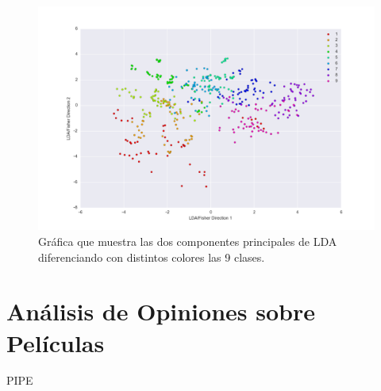 \documentclass[letter, 10pt]{article}
\begin{document}
\begin{figure}[h]
\begin{center}
\includegraphics[width=1\textwidth]{Images/figure_2.png}
\caption{Gráfica que muestra las dos componentes principales de LDA diferenciando con distintos colores las 9 clases.}
\label{G1.2}
\end{center}
\end{figure}


\section{Análisis de Opiniones sobre Películas}

PIPE



\end{document}
